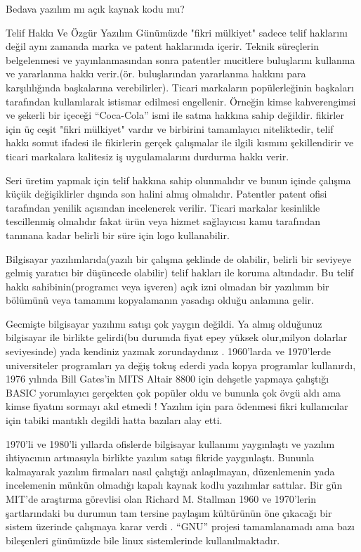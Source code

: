 \documentclass[10pt,a5paper]{book}
\begin{document}
\begin{section}{Bedava yazılım mı açık kaynak kodu mu?}
\begin{subsection}{Telif Hakkı Ve Özgür Yazılım}
Günümüzde "fikri mülkiyet" sadece telif haklarını değil aynı zamanda marka ve patent haklarınıda içerir. Teknik süreçlerin belgelenmesi  ve yayınlanmasından sonra patentler mucitlere buluşlarını kullanma ve yararlanma hakkı verir.(ör. buluşlarından yararlanma hakkını para karşılılığında başkalarına verebilirler). Ticari markaların popülerleğinin başkaları tarafından kullanılarak istismar edilmesi engellenir. Örneğin kimse  kahverengimsi ve şekerli bir içeceği “Coca-Cola” ismi ile satma hakkına sahip değildir. fikirler için üç ceşit "fikri mülkiyet"  vardır ve birbirini tamamlayıcı niteliktedir, telif hakkı somut ifadesi ile fikirlerin gerçek çalışmalar ile ilgili kısmını şekillendirir ve ticari markalara  kalitesiz iş uygulamalarını durdurma hakkı verir.

Seri üretim yapmak için telif hakkına sahip olunmalıdır ve bunun içinde çalışma küçük değişiklirler dışında son halini almış olmalıdır. Patentler patent ofisi tarafından yenilik açısından incelenerek verilir. Ticari markalar kesinlikle tescillenmiş olmalıdır fakat ürün veya hizmet sağlayıcısı kamu tarafından tanınana kadar  belirli bir süre için logo kullanabilir.

Bilgisayar yazılımlarıda(yazılı bir çalışma şeklinde de olabilir, belirli bir seviyeye gelmiş yaratıcı bir düşüncede olabilir) telif hakları ile koruma altındadır. Bu telif hakkı sahibinin(programcı veya işveren) açık izni olmadan bir yazılımın bir bölümünü veya tamamını kopyalamanın yasadışı olduğu anlamına gelir.

Gecmişte bilgisayar yazılımı satışı çok yaygın değildi. Ya almış olduğunuz bilgisayar ile birlikte gelirdi(bu durumda fiyat epey yüksek olur,milyon dolarlar seviyesinde) yada kendiniz yazmak zorundaydınız . 1960'larda ve 1970'lerde universiteler programları ya değiş tokuş ederdi yada kopya programlar kullanırdı, 1976 yılında Bill Gates'in   MITS Altair 8800 için dehşetle yapmaya çalıştığı BASIC yorumlayıcı gerçekten çok popüler oldu ve bununla çok övgü aldı ama kimse fiyatını sormayı akıl etmedi ! Yazılım için para ödenmesi fikri kullanıcılar için tabiki mantıklı degildi hatta bazıları alay etti.

1970'li ve 1980'li yıllarda ofislerde bilgisayar kullanımı yaygınlaştı ve yazılım ihtiyacının artmasıyla birlikte yazılım satışı fikride yaygınlaştı. Bununla kalmayarak yazılım firmaları nasıl çalıştığı anlaşılmayan, düzenlemenin yada incelemenin münkün olmadığı kapalı kaynak kodlu yazılımlar sattılar. Bir gün MIT'de araştırma görevlisi olan Richard M. Stallman 1960 ve 1970'lerin şartlarındaki bu durumun tam tersine paylaşım kültürünün öne çıkacağı bir sistem üzerinde çalışmaya karar verdi . “GNU” projesi tamamlanamadı ama bazı bileşenleri günümüzde bile linux sistemlerinde kullanılmaktadır.


\end{subsection}
\end{section}
\end{document}
